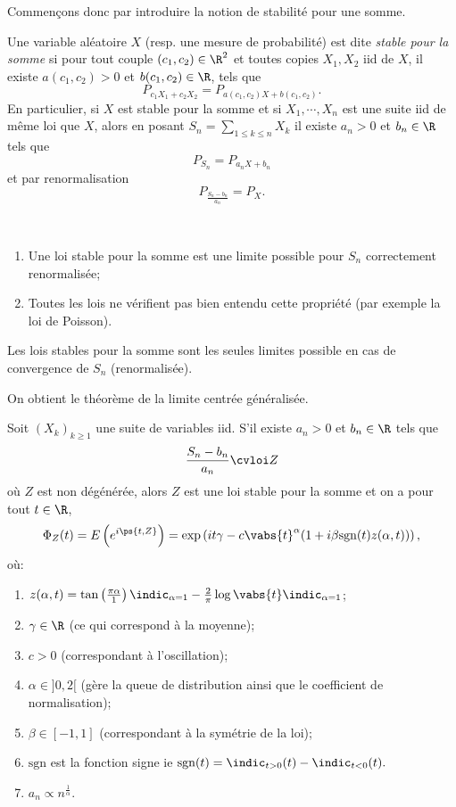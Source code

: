 \documentclass[10p,a4paper,reqno,titlepage]{report}
\begin{document}
Commençons donc par introduire la notion de stabilité pour une somme.
\begin{de}
	Une variable aléatoire $X$ (resp. une mesure de probabilité) est dite \textit{stable pour la somme} si pour tout couple $(c_1,c_2)\in\R^2$ et toutes copies $X_1,X_2$ iid de $X$, il existe $a(c_1,c_2)>0$ et $b(c_1,c_2) \in \R$, tels que 
	$$ P_{c_1 X_1 + c_2 X_2} = P_{a(c_1,c_2)X+ b(c_1,c_2)}.$$
	En particulier, si $X$ est stable pour la somme et si $X_1,\cdots,X_n$ est une suite iid de même loi que $X$, alors en posant $S_n = \sum_{1\leq k \leq n} X_k$ il existe $a_n >0$ et $b_n \in\R$ tels que
	$$ P_{S_n}= P_{a_n X +b_n}$$
	et par renormalisation
	$$ P_{\frac{S_n -b_n}{a_n}}=P_X.$$
\end{de}

\begin{rem}\
	\begin{enumerate}
	\item Une loi stable pour la somme est une limite possible pour $S_n$ correctement renormalisée;
	\item Toutes les lois ne vérifient pas bien entendu cette propriété (par exemple la loi de Poisson).
	\end{enumerate}
\end{rem}
\begin{prop}
	Les lois stables pour la somme sont les seules limites possible en cas de convergence de $S_n$ (renormalisée).
\end{prop}
On obtient le théorème de la limite centrée généralisée.
\begin{thm}
	Soit $(X_k)_{k\geq 1}$ une suite de variables iid. S'il existe $a_n > 0$ et $b_n \in\R$ tels que
	$$ \frac{S_n - b_n}{a_n} \cvloi Z$$
	où $Z$ est non dégénérée, alors $Z$ est une loi stable pour la somme et on a pour tout $t\in \R$,
	$$ \Phi_Z (t)= E \left(e^{i \ps{t,Z}}\right)= \exp\left( it \gamma -c\vabs{t}^\alpha (1 +i \beta \mathrm{sgn}(t)z (\alpha,t))\right),$$
	où:\
	\begin{enumerate}
		\item $z(\alpha,t) = \tan\left(\frac{\pi \alpha}{1}\right) \indic_{\alpha=1}  - \frac{2}{\pi} \log\vabs{t}\indic_{\alpha=1}$;
		\item $\gamma\in \R$ (ce qui correspond à la moyenne);
		\item $c>0$ (correspondant à l'oscillation);
		\item $\alpha \in ]0,2[$ (gère la queue de distribution ainsi que le coefficient de normalisation);
		\item $\beta \in [-1,1]$ (correspondant à la symétrie de la loi);
		\item $\mathrm{sgn}$ est la fonction signe ie $\mathrm{sgn}(t)= \indic_{t>0} (t) - \indic_{t<0}(t).$
		\item $a_n \varpropto n^{\tfrac{1}{\alpha}}.$ 
	\end{enumerate}
\end{thm}
\end{document}
